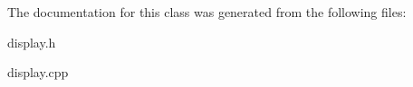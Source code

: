 The documentation for this class was generated from the following files:\begin{DoxyCompactItemize}
\item 
display.h\item 
display.cpp\end{DoxyCompactItemize}
